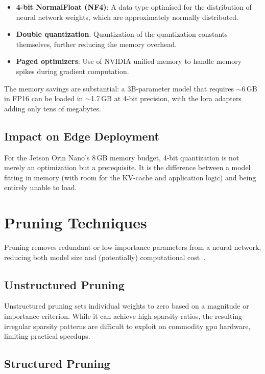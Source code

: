 \documentclass[12pt,a4paper,oneside]{report}
\begin{document}
\begin{itemize}
    \item \textbf{4-bit NormalFloat (NF4)}: A data type optimised for the distribution of neural network weights, which are approximately normally distributed.
    \item \textbf{Double quantization}: Quantization of the quantization constants themselves, further reducing the memory overhead.
    \item \textbf{Paged optimizers}: Use of NVIDIA unified memory to handle memory spikes during gradient computation.
\end{itemize}

The memory savings are substantial: a 3B-parameter model that requires $\sim$6\,GB in FP16 can be loaded in $\sim$1.7\,GB at 4-bit precision, with the \gls{lora} adapters adding only tens of megabytes.

\subsection{Impact on Edge Deployment}

For the Jetson Orin Nano's 8\,GB memory budget, 4-bit quantization is not merely an optimization but a prerequisite. It is the difference between a model fitting in memory (with room for the KV-cache and application logic) and being entirely unable to load.


\section{Pruning Techniques}
\label{sec:sota-pruning}

Pruning removes redundant or low-importance parameters from a neural network, reducing both model size and (potentially) computational cost~\cite{lecun1989optimal,han2015learning}.

\subsection{Unstructured Pruning}

Unstructured pruning sets individual weights to zero based on a magnitude or importance criterion. While it can achieve high sparsity ratios, the resulting irregular sparsity patterns are difficult to exploit on commodity \gls{gpu} hardware, limiting practical speedups.

\subsection{Structured Pruning}
\end{document}
